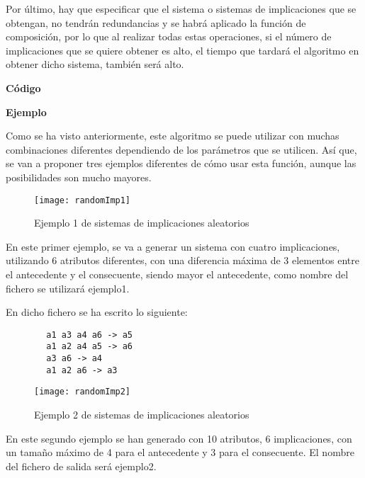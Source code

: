     Por \'ultimo, hay que especificar que el sistema o sistemas de implicaciones que se obtengan, no tendr\'an redundancias y se habr\'a aplicado 
    la funci\'on de composici\'on, por lo que al realizar todas estas operaciones, si el n\'umero de implicaciones que se quiere obtener es 
    alto, el tiempo que tardar\'a el algoritmo en obtener dicho sistema, tambi\'en ser\'a alto.
    \\

    \bigskip

    \textbf{C\'odigo}

    
    \clearpage


    \textbf{Ejemplo}

    Como se ha visto anteriormente, este algoritmo se puede utilizar con muchas combinaciones diferentes dependiendo de los par\'ametros 
    que se utilicen. As\'i que, se van a proponer tres ejemplos diferentes de c\'omo usar esta funci\'on, aunque las posibilidades 
    son mucho mayores.

    \bigskip

    \begin{figure}[H]
        \centering
        \texttt{[image: randomImp1]}
        \caption{Ejemplo 1 de sistemas de implicaciones aleatorios}
        \label{fig:randomImp1}
    \end{figure}

    En este primer ejemplo, se va a generar un sistema con cuatro implicaciones, utilizando 6 atributos diferentes, con una diferencia m\'axima 
    de 3 elementos entre el antecedente y el consecuente, siendo mayor el antecedente, como nombre del fichero se utilizar\'a ejemplo1.
    
    En dicho fichero se ha escrito lo siguiente:

    \begin{verbatim}
        a1 a3 a4 a6 -> a5 
        a1 a2 a4 a5 -> a6 
        a3 a6 -> a4 
        a1 a2 a6 -> a3    
    \end{verbatim}


    \begin{figure}[H]
        \centering
        \texttt{[image: randomImp2]}
        \caption{Ejemplo 2 de sistemas de implicaciones aleatorios}
        \label{fig:randomImp2}
    \end{figure}

    En este segundo ejemplo se han generado con 10 atributos, 6 implicaciones, con un tama\~no m\'aximo de 4 para el antecedente y 3 para el 
    consecuente. El nombre del fichero de salida ser\'a ejemplo2.


